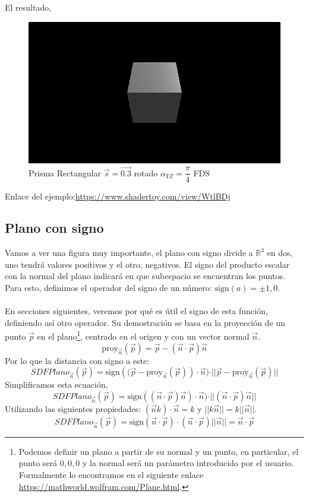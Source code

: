 El resultado,
\begin{figure}[H]
  \centering
  \captionsetup{justification=centering}%
  \includegraphics[width=1.0\textwidth]{secciones/imagenes/sdf/3d/sdf_prisma_rect.png}
  \caption{Prisma Rectangular \(\Vec{s}=\Vec{0.3}\) rotado \(\alpha_{YZ}=\dfrac{\pi}{4}\) FDS}
  \label{fig:prisma}
\end{figure}

Enlace del ejemplo:\url{https://www.shadertoy.com/view/WtlBDj}

\subsection{Plano con signo}
Vamos a ver una figura muy importante, el plano con signo divide a \(\mathbb{R}^3\) en dos, uno tendrá valores positivos y el otro, negativos. El signo del producto escalar con la normal del plano indicará en que subespacio se encuentran los puntos. Para esto, definimos el operador del signo de un número:  \(\text{sign}(a)=\pm 1, 0\).\\\\
En secciones siguientes, veremos por qué es útil el signo de esta función, definiendo así otro operador. Su demostración se basa en la proyección de un punto \(\Vec{p}\) en el plano\footnote{Podemos definir un plano a partir de su normal y un punto, en particular, el punto será \(0,0,0\) y la normal será un parámetro introducido por el usuario. Formalmente lo encontramos en el siguiente enlace \url{https://mathworld.wolfram.com/Plane.html}.}, centrado en el origen y con un vector normal \(\Vec{n}\).
\[\text{proy}_{\Vec{n}}(\Vec{p}) = \Vec{p} - (\Vec{n}\cdot\Vec{p})\Vec{n} \]
Por lo que la distancia con signo a este:
\[ SDFPlano_{\Vec{n}}(\Vec{p})=\text{sign}\left((\Vec{p}-\text{proy}_{\Vec{n}}(\Vec{p})\right) \cdot \Vec{n})\cdot \vert \vert \Vec{p} - \text{proy}_{\Vec{n}}(\Vec{p}) \vert\vert \]
Simplificamos esta ecuación,
\[ SDFPlano_{\Vec{n}}(\Vec{p}) = \text{sign}\left((\Vec{n}\cdot\Vec{p})\Vec{n}\right) \cdot \Vec{n})\cdot \vert \vert (\Vec{n}\cdot\Vec{p})\Vec{n}  \vert\vert \]
Utilizando las siguientes propiedades: \((\Vec{n}k)\cdot\Vec{n}=k\) y \(\vert\vert k\Vec{n}\vert\vert=k\vert\vert\Vec{n}\vert\vert\).
\[ SDFPlano_{\Vec{n}}(\Vec{p})=\text{sign}\left(\Vec{n}\cdot\Vec{p}\right)\cdot (\Vec{n}\cdot\Vec{p}) \vert \vert\Vec{n}\vert\vert=\Vec{n}\cdot\Vec{p}\]

